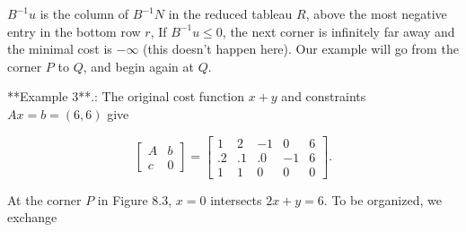 \(B^{-1}u\) is the column of \(B^{-1}N\) in the reduced tableau \(R\), above the most negative entry in the bottom row \(r\), If \(B^{-1}u\leq 0\), the next corner is infinitely far away and the minimal cost is \(-\infty\) (this doesn't happen here). Our example will go from the corner \(P\) to \(Q\), and begin again at \(Q\).

**Example 3**.: The original cost function \(x+y\) and constraints \(Ax=b=(6,6)\) give

\[\begin{bmatrix}A&b\\ c&0\end{bmatrix}=\left[\begin{array}{rrrrr}1&2&-1&0&6\\ .2&.1&.0&-1&6\\ 1&1&0&0&0\end{array}\right].\]

At the corner \(P\) in Figure 8.3, \(x=0\) intersects \(2x+y=6\). To be organized, we exchange 